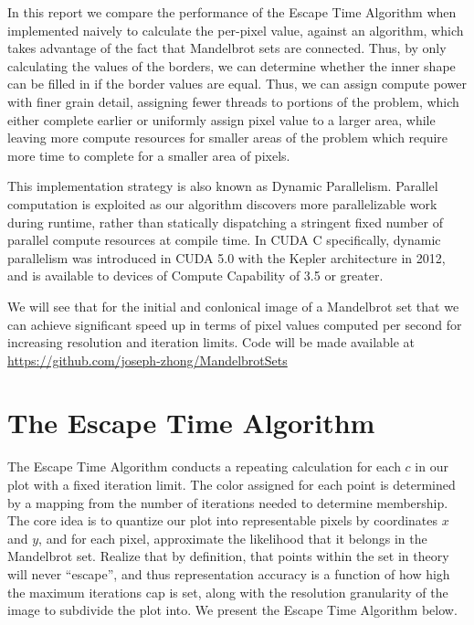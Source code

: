 \documentclass[letterpaper]{article}
\begin{document}
\begin{multicols}{2}
In this report we compare the performance of the Escape Time Algorithm when 
  implemented naively to calculate the per-pixel value, against an algorithm,
  which takes advantage of the fact that Mandelbrot sets are connected. Thus, by
  only calculating the values of the borders, we can determine whether the inner
  shape can be filled in if the border values are equal. Thus, we can assign
  compute power with finer grain detail, assigning fewer threads to portions of
  the problem, which either complete earlier or uniformly assign pixel value to
  a larger area, while leaving more compute resources for smaller areas of the
  problem which require more time to complete for a smaller area of pixels.

This implementation strategy is also known as Dynamic Parallelism. Parallel
  computation is exploited as our algorithm discovers more parallelizable work
  during runtime, rather than statically dispatching a stringent fixed number of
  parallel compute resources at compile time. In CUDA C specifically, dynamic
  parallelism was introduced in CUDA 5.0 with the Kepler architecture in 2012,
  and is available to devices of Compute Capability of 3.5 or greater. 

We will see that for the initial and conlonical image of a Mandelbrot set that
  we can achieve significant speed up in terms of pixel values computed per 
  second for increasing resolution and iteration limits. Code will be made
  available at \url{https://github.com/joseph-zhong/MandelbrotSets}

  \section{The Escape Time Algorithm}

The Escape Time Algorithm conducts a repeating calculation for each $c$ in our
  plot with a fixed iteration limit. The color assigned for each point is
  determined by a mapping from the number of iterations needed to determine
  membership. The core idea is to quantize our plot into representable pixels
  by coordinates $x$ and $y$, and for each pixel, approximate the likelihood
  that it belongs in the Mandelbrot set. Realize that by definition, that points
  within the set in theory will never ``escape'',  and thus representation
  accuracy is a function of how high the maximum iterations cap is set, along
  with the resolution granularity of the image to subdivide the plot into.
We present the Escape Time Algorithm below.


\end{multicols}
\end{document}
